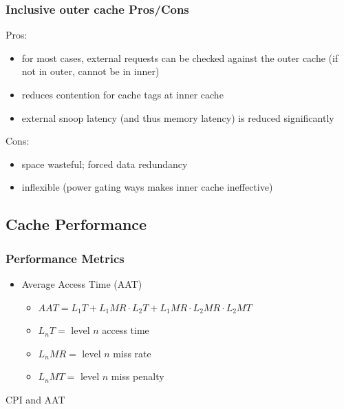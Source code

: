 \documentclass[12pt]{extarticle}
\begin{document}
	\subsubsection{Inclusive outer cache Pros/Cons}

	Pros:

	\begin{itemize}
		\item for most cases, external requests can be checked against the outer cache (if not in outer, cannot be in inner)
		\item reduces contention for cache tags at inner cache
		\item external snoop latency (and thus memory latency) is reduced significantly
	\end{itemize}
	
	\noindent Cons:

	\begin{itemize}
		\item space wasteful; forced data redundancy
		\item inflexible (power gating ways makes inner cache ineffective)
	\end{itemize}

	\subsection{Cache Performance}

	\subsubsection{Performance Metrics}

	\begin{itemize}
		\item Average Access Time (AAT)
		\begin{itemize}
			\item $AAT = L_1T + L_1MR \cdot L_2T + L_1MR \cdot L_2MR \cdot L_2MT$
			\item $L_nT =$ level $n$ access time
			\item $L_nMR =$ level $n$ miss rate
			\item $L_nMT =$ level $n$ miss penalty
		\end{itemize}
	\end{itemize}

	\noindent CPI and AAT
\end{document}
